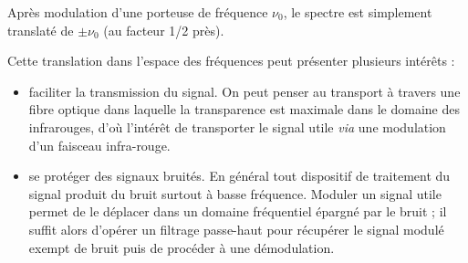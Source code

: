 \begin{kaobox}[frametitle=Théorème de modulation]
Après modulation d'une porteuse de fréquence \(\nu_0\), le spectre est simplement translaté de \(\pm \nu_0\) (au facteur 1/2 près).
\end{kaobox}
Cette translation dans l'espace des fréquences peut présenter plusieurs intérêts :
\begin{itemize}
	\item faciliter la transmission du signal. On peut penser au transport à travers une fibre optique dans laquelle la transparence est maximale dans le domaine des infrarouges, d'où l'intérêt de transporter le signal utile \emph{via} une modulation d'un faisceau infra-rouge.
	\item se protéger des signaux bruités. En général tout dispositif de traitement du signal produit du bruit surtout à basse fréquence. Moduler un signal utile permet de le déplacer dans un domaine fréquentiel épargné par le bruit ; il suffit alors d'opérer un filtrage passe-haut pour récupérer le signal modulé exempt de bruit puis de procéder à une démodulation.
\end{itemize}
